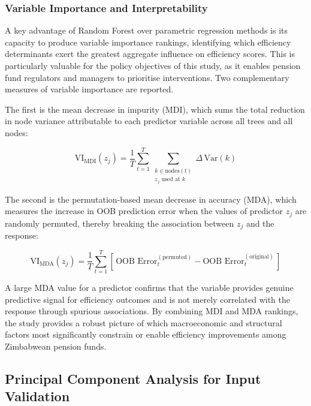 \documentclass[12pt,a4paper]{article}
\begin{document}
\subsubsection{Variable Importance and Interpretability}

A key advantage of Random Forest over parametric regression methods is its capacity to produce variable importance rankings, identifying which efficiency determinants exert the greatest aggregate influence on efficiency scores. This is particularly valuable for the policy objectives of this study, as it enables pension fund regulators and managers to prioritise interventions. Two complementary measures of variable importance are reported.

The first is the mean decrease in impurity (MDI), which sums the total reduction in node variance attributable to each predictor variable across all trees and all nodes:

\begin{equation}
    \text{VI}_{\text{MDI}}(z_j) = \frac{1}{T} \sum_{t=1}^{T} \sum_{\substack{k \in \text{nodes}(t) \\ z_j \text{ used at } k}} \Delta\,\text{Var}(k)
\end{equation}

The second is the permutation-based mean decrease in accuracy (MDA), which measures the increase in OOB prediction error when the values of predictor $z_j$ are randomly permuted, thereby breaking the association between $z_j$ and the response:

\begin{equation}
    \text{VI}_{\text{MDA}}(z_j) = \frac{1}{T} \sum_{t=1}^{T} \left[\,\text{OOB Error}_{t}^{(\text{permuted})} - \text{OOB Error}_{t}^{(\text{original})}\,\right]
\end{equation}

A large MDA value for a predictor confirms that the variable provides genuine predictive signal for efficiency outcomes and is not merely correlated with the response through spurious associations. By combining MDI and MDA rankings, the study provides a robust picture of which macroeconomic and structural factors most significantly constrain or enable efficiency improvements among Zimbabwean pension funds.

\subsection{Principal Component Analysis for Input Validation}
\end{document}
